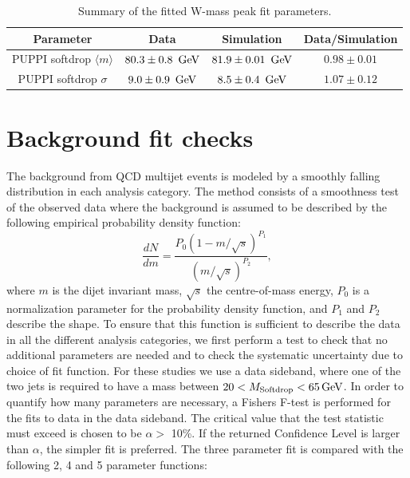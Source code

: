 \begin{table}[!h]
 \begin{center}
 \begin{tabular}{c|c|c|c}
  Parameter & Data & Simulation & Data/Simulation \\
  \hline
  PUPPI softdrop $\langle m \rangle$ & $80.3 \pm 0.8~{\rm \,\text{Ge\hspace{-.08em}V}}$ & $81.9 \pm 0.01~{\rm \,\text{Ge\hspace{-.08em}V}}$ & $0.98 \pm 0.01$ \\%
  PUPPI softdrop $\sigma$            & $ 9.0 \pm 0.9~{\rm \,\text{Ge\hspace{-.08em}V}}$ &  $8.5 \pm 0.4~{\rm \,\text{Ge\hspace{-.08em}V}}$  & $1.07 \pm 0.12$ \\%
  \hline
 \end{tabular}
 \caption{Summary of the fitted W-mass peak fit parameters.}
 \label{tab:app:wtagparams}
 \end{center}
\end{table}
\clearpage
\section{Background fit checks}
\label{app:2016xcheck}

The background from QCD multijet events is modeled by a smoothly falling distribution in each analysis category. The method consists of a smoothness test of the observed data where the background is assumed to be described by the following empirical probability density function:
\begin{equation}
\label{eq:dijet}
\frac{dN}{dm}= \frac{ P_0(1-m/\sqrt{s})^{P_1} } { (m/\sqrt{s})^{P_2} },
\end{equation}
where $m$ is the dijet invariant mass, $\sqrt{s}$ the centre-of-mass energy, $P_0$ is a normalization parameter for the probability density function, and $P_1$ and $ P_2$ describe the shape. To ensure that this function is sufficient to describe the data in all the different analysis categories, we first perform a test to check that no additional parameters are needed and to check the systematic uncertainty due to choice of fit function. For these studies we use a data sideband, where one of the two jets is required to have a mass between $20 < M_{\rm{Softdrop}} < 65 \,\text{Ge\hspace{-.08em}V}$. In order to quantify how many parameters are necessary, a Fishers F-test is performed for the fits to data in the data sideband. The critical value that the test statistic must exceed is chosen to be $\alpha > $ 10\%. If the returned Confidence Level is larger than $\alpha$, the simpler fit is preferred.
The three parameter fit is compared with the following 2, 4 and 5 parameter functions:

